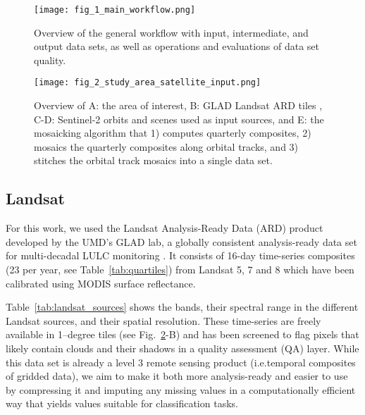 \begin{figure}[!hbt]
\centering
\hspace*{-2.9cm}
\texttt{[image: fig\_1\_main\_workflow.png]}
\caption{Overview of the general workflow with input, intermediate, and output data sets, as well as operations and evaluations of data set quality.}
\label{fig:1_methods_workflow}
\end{figure}


\begin{figure}
    \texttt{[image: fig\_2\_study\_area\_satellite\_input.png]}
    \caption{Overview of A: the area of interest, B: GLAD Landsat ARD tiles , C-D: Sentinel-2 orbits and scenes used as input sources, and E: the mosaicking algorithm that 1) computes quarterly composites, 2) mosaics the quarterly composites along orbital tracks, and 3) stitches the orbital track mosaics into a single data set.} 
    \label{fig:2_study_area_satellite_input}
\end{figure}



\subsection*{Landsat}
For this work, we used the Landsat Analysis-Ready Data (ARD) product developed by the UMD's GLAD lab, a globally consistent analysis-ready data set for multi-decadal LULC monitoring \citep{potapov2020landsat}. It consists of 16-day time-series composites (23 per year, see Table~\ref{tab:quartiles}) from Landsat 5, 7 and 8 which have been calibrated using MODIS surface reflectance. 

Table~\ref{tab:landsat_sources} shows the bands, their spectral range in the different Landsat sources, and their spatial resolution. These time-series are freely available in 1--degree tiles (see Fig.\@~\ref{fig:2_study_area_satellite_input}-B) and has been screened to flag pixels that likely contain clouds and their shadows in a quality assessment (QA) layer. While this data set is already a level 3 remote sensing product (i.e.\@ temporal composites of gridded data), we aim to make it both more analysis-ready and easier to use by compressing it and imputing any missing values in a computationally efficient way that yields values suitable for classification tasks.

